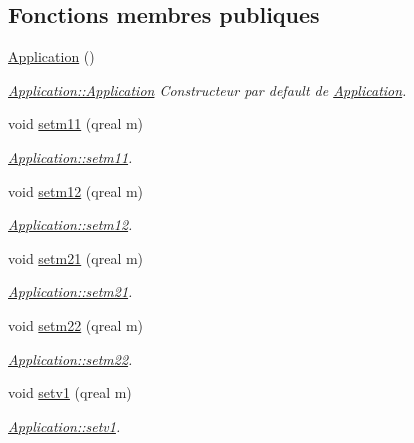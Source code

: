\subsection*{Fonctions membres publiques}
\begin{DoxyCompactItemize}
\item 
\hyperlink{class_application_afa8cc05ce6b6092be5ecdfdae44e05f8}{Application} ()
\begin{DoxyCompactList}\small\item\em \hyperlink{class_application_afa8cc05ce6b6092be5ecdfdae44e05f8}{Application\+::\+Application} Constructeur par default de \hyperlink{class_application}{Application}. \end{DoxyCompactList}\item 
void \hyperlink{class_application_a6497226f03c582468906c2752fb3e604}{setm11} (qreal m)
\begin{DoxyCompactList}\small\item\em \hyperlink{class_application_a6497226f03c582468906c2752fb3e604}{Application\+::setm11}. \end{DoxyCompactList}\item 
void \hyperlink{class_application_abf90c1d5903aa1ae2d4bfb05922f5742}{setm12} (qreal m)
\begin{DoxyCompactList}\small\item\em \hyperlink{class_application_abf90c1d5903aa1ae2d4bfb05922f5742}{Application\+::setm12}. \end{DoxyCompactList}\item 
void \hyperlink{class_application_a9aed2c898106e2f7bb32c115860415d1}{setm21} (qreal m)
\begin{DoxyCompactList}\small\item\em \hyperlink{class_application_a9aed2c898106e2f7bb32c115860415d1}{Application\+::setm21}. \end{DoxyCompactList}\item 
void \hyperlink{class_application_a32c06028e2ad3396d49fec90db0e51ac}{setm22} (qreal m)
\begin{DoxyCompactList}\small\item\em \hyperlink{class_application_a32c06028e2ad3396d49fec90db0e51ac}{Application\+::setm22}. \end{DoxyCompactList}\item 
void \hyperlink{class_application_a71f187ec6cbb5be46a9c56c8997b7295}{setv1} (qreal m)
\begin{DoxyCompactList}\small\item\em \hyperlink{class_application_a71f187ec6cbb5be46a9c56c8997b7295}{Application\+::setv1}. \end{DoxyCompactList}\item 

\end{DoxyCompactItemize}
